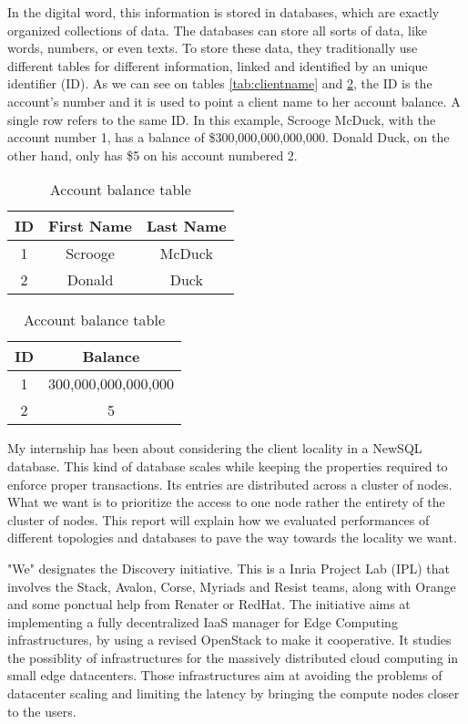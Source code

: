 In the digital word, this information is stored in databases, which are exactly organized collections of data. The databases can store all sorts of data, like words, numbers, or even texts. To store these data, they traditionally use different tables for different information, linked and identified by an unique identifier (ID). As we can see on tables \ref{tab:clientname} and \ref{tab:accountbalance}, the ID is the account's number and it is used to point a client name to her account balance. A single row refers to the same ID. In this example, Scrooge McDuck, with the account number 1, has a balance of \$300,000,000,000,000. Donald Duck, on the other hand, only has \$5 on his account numbered 2.
\begin{table}[H]
  \begin{minipage}[b]{0.45\linewidth}\centering
\begin{tabular}{|c|c|c|}
\hline
ID & First Name & Last Name \\
\hline
1 & Scrooge & McDuck \\
2 & Donald & Duck \\
\hline
\end{tabular}
\caption{Client name table}
\label{tab:clientname}
  \end{minipage}
\begin{minipage}[b]{0.45\linewidth}\centering

\begin{tabular}{|c|c|}
\hline
ID & Balance \\
\hline
1 & 300,000,000,000,000 \\
2 & 5 \\
\hline
\end{tabular}
\caption{Account balance table}
\label{tab:accountbalance}
\end{minipage}
\end{table}


My internship has been about considering the client locality in a NewSQL database. This kind of database scales while keeping the properties required to enforce proper transactions. Its entries are distributed across a cluster of nodes. What we want is to prioritize the access to one node rather the entirety of the cluster of nodes. This report will explain how we evaluated performances of different topologies and databases to pave the way towards the locality we want.

"We" designates the Discovery initiative\cite{discovery}. This is a Inria Project Lab (IPL) that involves the Stack, Avalon, Corse, Myriads and Resist teams, along with Orange and some ponctual help from Renater or RedHat. The initiative aims at implementing a fully decentralized IaaS manager for Edge Computing infrastructures, by using a revised OpenStack to make it cooperative. It studies the possiblity of infrastructures for the massively distributed cloud computing in small edge datacenters. Those infrastructures aim at avoiding the problems of datacenter scaling and limiting the latency by bringing the compute nodes closer to the users.


